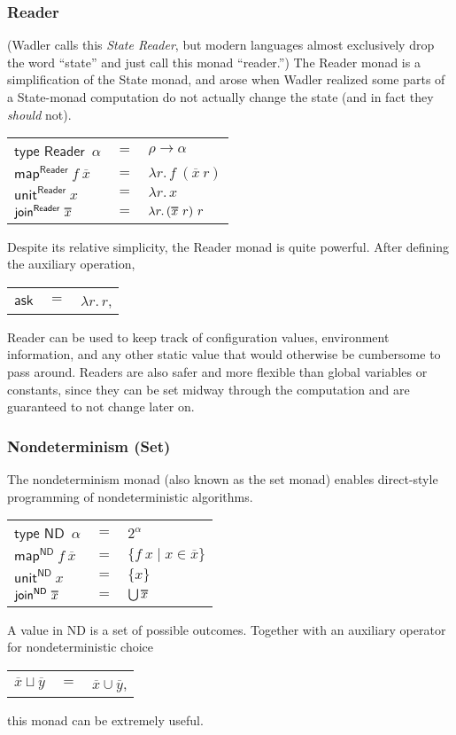 \documentclass[acmsmall, nonacm, screen]{acmart}
\newcommand\doverline[1]{%
  \setbox0=\hbox{$\overline{#1}$}%
  \ht0=\dimexpr\ht0-.30ex\relax%
  \overline{\copy0}%
}
\newcommand{\lambdaE}[2]{\lambda #1.\, #2}
\newcommand{\map}[3]{\textsf{map}^{\textsf{#1}}~#2~#3}
\newcommand{\unit}[2]{\textsf{unit}^{\textsf{#1}}~#2}
\newcommand{\join}[2]{\textsf{join}^{\textsf{#1}}~#2}
\begin{document}
\subsubsection{Reader}
(Wadler calls this {\em State Reader}, but modern languages almost exclusively drop the word
``state'' and just call this monad ``reader.'') The \textsf{Reader} monad is a simplification of
the \textsf{State} monad, and arose when Wadler realized some parts of a \textsf{State}-monad
computation do not actually change the state (and in fact they {\em should} not).
\begin{center}
  \begin{tabular}{lll}
    $\textsf{type Reader}$~$\alpha$ & $=$ & $\rho \to \alpha$ \\
    $\map{Reader}{f}{\overline{x}}$ & $=$ & $\lambdaE{r}{f~(\overline{x}~r)}$ \\
    $\unit{Reader}{x}$ & $=$ & $\lambdaE{r}{x}$ \\
    $\join{Reader}{\doverline{x}}$ & $=$ & $\lambdaE{r}{(\doverline{x}~r)~r}$
  \end{tabular}
\end{center}
Despite its relative simplicity, the \textsf{Reader} monad is quite powerful. After defining the
auxiliary operation,
\begin{center}
  \begin{tabular}{lll}
    $\textsf{ask}$ & $=$ & $\lambdaE{r}{r}$,
  \end{tabular}
\end{center}
\textsf{Reader} can be used to keep track of configuration values, environment information, and
any other static value that would otherwise be cumbersome to pass around. Readers are also safer
and more flexible than global variables or constants, since they can be set midway through the
computation and are guaranteed to not change later on.

\subsubsection{Nondeterminism (Set)}
The nondeterminism monad (also known as the set monad) enables direct-style programming of
nondeterministic algorithms.
\begin{center}
  \begin{tabular}{lll}
    $\textsf{type ND}$~$\alpha$ & $=$ & $2^\alpha$ \\
    $\map{ND}{f}{\overline{x}}$ & $=$ & $\{f~x \mid x \in \overline{x}\}$ \\
    $\unit{ND}{x}$ & $=$ & $\{x\}$ \\
    $\join{ND}{\doverline{x}}$ & $=$ & $\bigcup \doverline{x}$
  \end{tabular}
\end{center}
A value in \textsf{ND} is a set of possible outcomes. Together with an auxiliary operator for
nondeterministic choice
\begin{center}
  \begin{tabular}{lll}
    $\overline{x} \sqcup \overline{y}$ & $=$ & $\overline{x} \cup \overline{y}$,
  \end{tabular}
\end{center}
this monad can be extremely useful.
\end{document}

